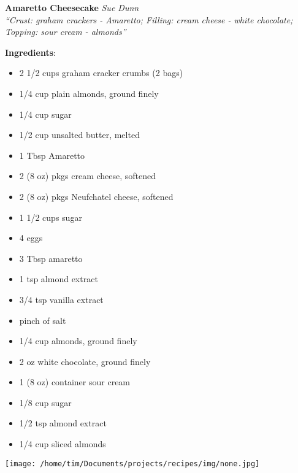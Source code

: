 \documentclass[11pt, twoside, openany]{book}
\begin{document}
\noindent\begin{minipage}[t]{\linewidth}%
{\Large\textbf{Amaretto Cheesecake}} \label{amaretto-cheesecake}\hfill\textit{Sue Dunn}\\
\textit{``Crust: graham crackers - Amaretto; Filling: cream cheese - white chocolate; Topping: sour cream - almonds''}\\
\noindent\begin{minipage}[t]{0.78\linewidth}%
\textbf{Ingredients}:\vspace{-3mm}
\begin{multicols}{2}
\begin{itemize}\setlength\itemsep{-1mm}
\item 2 1/2 cups graham cracker crumbs (2 bags)
\item 1/4 cup plain almonds, ground finely
\item 1/4 cup sugar
\item 1/2 cup unsalted butter, melted
\item 1 Tbsp Amaretto
\item 2 (8 oz) pkgs cream cheese, softened
\item 2 (8 oz) pkgs Neufchatel cheese, softened
\item 1 1/2 cups sugar
\item 4 eggs
\item 3 Tbsp amaretto
\item 1 tsp almond extract
\item 3/4 tsp vanilla extract
\item pinch of salt
\item 1/4 cup almonds, ground finely
\item 2 oz white chocolate, ground finely
\item 1 (8 oz) container sour cream
\item 1/8 cup sugar
\item 1/2 tsp almond extract
\item 1/4 cup sliced almonds
\end{itemize}
\end{multicols}
\end{minipage}
\noindent\begin{minipage}[t]{0.18\linewidth}
\centering \strut\vspace*{-\baselineskip}\newline
\texttt{[image: /home/tim/Documents/projects/recipes/img/none.jpg]}\\
\end{minipage}\vspace{3mm}

\end{minipage}
\end{document}
